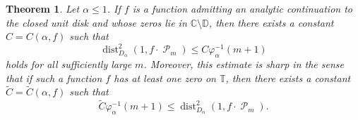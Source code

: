 \documentclass[11 pt,reqno]{amsart}
\newtheorem{thm}{Theorem}[section]
\theoremstyle{definition}
\theoremstyle{remark}
\numberwithin{equation}{section} \numberwithin{figure}{section}
\newcommand{\CC}{{\mathbb C}}
\newcommand{\DD}{{\mathbb D}}
\newcommand{\TT}{{\mathbb T}}
\DeclareMathOperator{\Pol}{{\mathcal P}}
\DeclareMathOperator{\dist}{dist}
\begin{document}
\begin{thm}\label{OptimalRate}
Let $\alpha\leq 1$.  If $f$ is a function admitting an analytic continuation to the
closed unit disk and whose zeros lie in $\CC\setminus\DD$, then there exists a constant
$C=C(\alpha,f)$ such that
\begin{equation*}
            \dist_{D_{\alpha}}^{2}(1,f\cdot\Pol_{m})
            \leq C\varphi_{\alpha}^{-1}(m+1)
\end{equation*}
holds for all sufficiently large $m$.  Moreover, this estimate is sharp in the sense that if
such a function $f$ has at least one zero on $\TT$, then there exists a constant
$\tilde{C}= \tilde{C}(\alpha,f)$ such that
\begin{equation*}
    \tilde{C} \varphi_{\alpha}^{-1}(m+1) \leq \dist_{D_{\alpha}}^{2}(1,f\cdot\Pol_{m}).
\end{equation*}
\end{thm}
\end{document}
